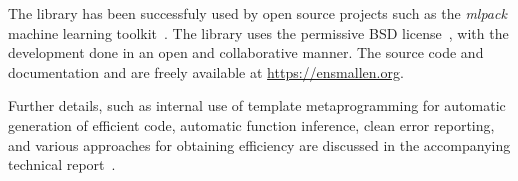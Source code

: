 \documentclass[twoside,11pt]{article}
\begin{document}
The library has been successfuly used by open source projects
such as the {\it mlpack} machine learning toolkit~\citep{mlpack2018}.
The library uses the permissive BSD license~\citep{Laurent_2008},
with the development done in an open and collaborative manner.
The source code and documentation and are freely available at \mbox{\url{https://ensmallen.org}}.

Further details, such as internal use of template metaprogramming
for automatic generation of efficient code, automatic function inference,
clean error reporting, and various approaches for obtaining efficiency
are discussed in the accompanying technical report~\citep{ensmallen2020}.




\end{document}
